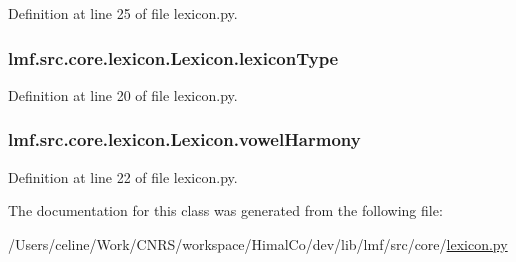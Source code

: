 Definition at line 25 of file lexicon.\+py.

\hypertarget{classlmf_1_1src_1_1core_1_1lexicon_1_1_lexicon_af434e15172d6aa59954db2a72c9f15f0}{
\subsubsection[{lexicon\+Type}]{\setlength{\rightskip}{0pt plus 5cm}lmf.\+src.\+core.\+lexicon.\+Lexicon.\+lexicon\+Type}}\label{classlmf_1_1src_1_1core_1_1lexicon_1_1_lexicon_af434e15172d6aa59954db2a72c9f15f0}


Definition at line 20 of file lexicon.\+py.

\hypertarget{classlmf_1_1src_1_1core_1_1lexicon_1_1_lexicon_a0c55ecd82285a7d3dc5d5ebcb1445c25}{
\subsubsection[{vowel\+Harmony}]{\setlength{\rightskip}{0pt plus 5cm}lmf.\+src.\+core.\+lexicon.\+Lexicon.\+vowel\+Harmony}}\label{classlmf_1_1src_1_1core_1_1lexicon_1_1_lexicon_a0c55ecd82285a7d3dc5d5ebcb1445c25}


Definition at line 22 of file lexicon.\+py.



The documentation for this class was generated from the following file\+:\begin{DoxyCompactItemize}
\item 
/\+Users/celine/\+Work/\+C\+N\+R\+S/workspace/\+Himal\+Co/dev/lib/lmf/src/core/\hyperlink{lexicon_8py}{lexicon.\+py}\end{DoxyCompactItemize}
